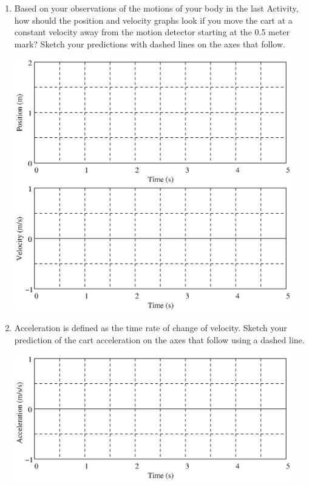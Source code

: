 \begin{enumerate}

\item Based on your observations of the motions of your body in the last Activity,
how should the position and velocity graphs look if you move the cart at a constant
velocity away from the motion detector starting at the 0.5 meter mark? Sketch
your predictions with dashed lines on the axes that follow.

{\par\centering \includegraphics[width=4.75in]{iqsRelatingMotion/changing_fig1.eps} \par}
\vspace{0.1cm}

\item Acceleration is defined as the time rate of change of velocity. Sketch your
prediction of the cart acceleration on the axes that follow using a dashed line.

{\par\centering \includegraphics[width=4.75in]{iqsRelatingMotion/changing_fig2.eps} \par}
\vspace{0.1cm}


\end{enumerate}
